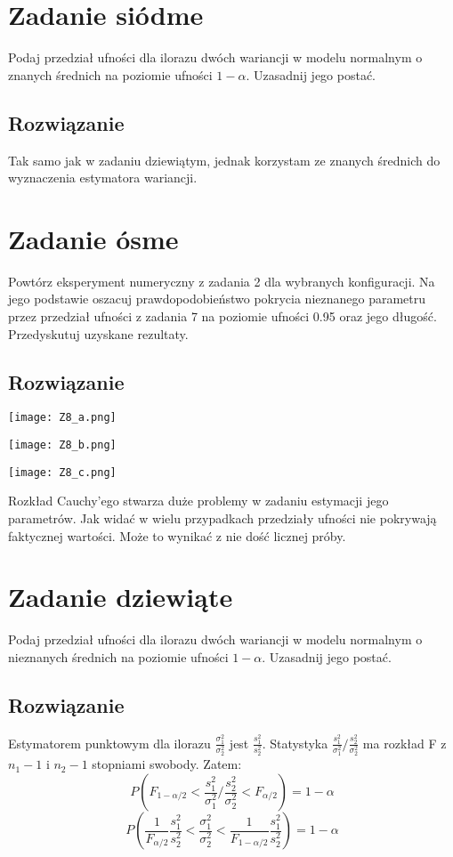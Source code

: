\documentclass[a4paper]{article}
\begin{document}
\section{Zadanie siódme}
Podaj przedział ufności dla ilorazu dwóch wariancji w modelu normalnym o znanych średnich na poziomie ufności $1-\alpha$. Uzasadnij jego postać.

\subsection{Rozwiązanie}
Tak samo jak w zadaniu dziewiątym, jednak korzystam ze znanych średnich do wyznaczenia estymatora wariancji.


\section{Zadanie ósme}
Powtórz eksperyment numeryczny z zadania 2 dla wybranych konfiguracji. Na jego podstawie oszacuj prawdopodobieństwo pokrycia nieznanego parametru przez przedział ufności z zadania 7 na poziomie ufności 0.95 oraz jego długość. Przedyskutuj uzyskane rezultaty.

\subsection{Rozwiązanie}

\texttt{[image: Z8\_a.png]}

\texttt{[image: Z8\_b.png]}

\texttt{[image: Z8\_c.png]}


Rozkład Cauchy'ego stwarza duże problemy w zadaniu estymacji jego parametrów. Jak widać w wielu przypadkach przedziały ufności nie pokrywają faktycznej wartości. Może to wynikać z nie dość licznej próby.

\section{Zadanie dziewiąte}
Podaj przedział ufności dla ilorazu dwóch wariancji w modelu normalnym o nieznanych średnich na poziomie ufności $1-\alpha$. Uzasadnij jego postać.

\subsection{Rozwiązanie}
Estymatorem punktowym dla ilorazu $\frac{\sigma_1^2}{\sigma_2^2}$ jest $\frac{s_1^2}{s_2^2}$. Statystyka $\frac{s_1^2}{\sigma_1^2}/\frac{s_2^2}{\sigma_2^2}$ ma rozkład F z $n_1-1$ i $n_2-1$ stopniami swobody. Zatem:
$$P(F_{1-\alpha/2}<\frac{s_1^2}{\sigma_1^2}/\frac{s_2^2}{\sigma_2^2}<F_{\alpha/2})=1-\alpha$$
$$P(\frac{1}{F_{\alpha/2}}\frac{s_1^2}{s_2^2}<\frac{\sigma_1^2}{\sigma_2^2}<\frac{1}{F_{1-\alpha/2}}\frac{s_1^2}{s_2^2})=1-\alpha$$
\end{document}
